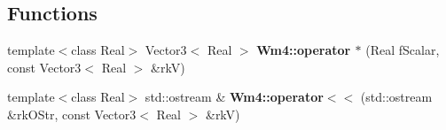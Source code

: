 \subsection*{Functions}
\begin{CompactItemize}
\item 
template$<$class Real$>$ Vector3$<$ Real $>$ {\bf Wm4::operator $\ast$} (Real f\-Scalar, const Vector3$<$ Real $>$ \&rk\-V)
\item 
template$<$class Real$>$ std::ostream \& {\bf Wm4::operator$<$$<$} (std::ostream \&rk\-OStr, const Vector3$<$ Real $>$ \&rk\-V)
\end{CompactItemize}
